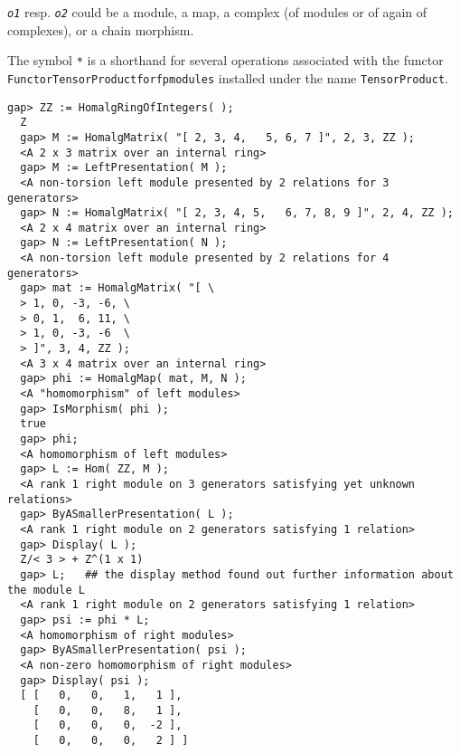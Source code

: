 \documentclass[a4paper,11pt]{report}
\begin{document}
{{{ \mbox{\texttt{\slshape o1}} resp. \mbox{\texttt{\slshape o2}} could be a module, a map, a complex (of modules or of again of complexes), or
a chain morphism. 

 The symbol \texttt{*} is a shorthand for several operations associated with the functor \texttt{Functor{\textunderscore}TensorProduct{\textunderscore}for{\textunderscore}fp{\textunderscore}modules} installed under the name \texttt{TensorProduct}. 
\begin{Verbatim}[fontsize=\small,frame=single,label=Example]
  gap> ZZ := HomalgRingOfIntegers( );
  Z
  gap> M := HomalgMatrix( "[ 2, 3, 4,   5, 6, 7 ]", 2, 3, ZZ );
  <A 2 x 3 matrix over an internal ring>
  gap> M := LeftPresentation( M );
  <A non-torsion left module presented by 2 relations for 3 generators>
  gap> N := HomalgMatrix( "[ 2, 3, 4, 5,   6, 7, 8, 9 ]", 2, 4, ZZ );
  <A 2 x 4 matrix over an internal ring>
  gap> N := LeftPresentation( N );
  <A non-torsion left module presented by 2 relations for 4 generators>
  gap> mat := HomalgMatrix( "[ \
  > 1, 0, -3, -6, \
  > 0, 1,  6, 11, \
  > 1, 0, -3, -6  \
  > ]", 3, 4, ZZ );
  <A 3 x 4 matrix over an internal ring>
  gap> phi := HomalgMap( mat, M, N );
  <A "homomorphism" of left modules>
  gap> IsMorphism( phi );
  true
  gap> phi;
  <A homomorphism of left modules>
  gap> L := Hom( ZZ, M );
  <A rank 1 right module on 3 generators satisfying yet unknown relations>
  gap> ByASmallerPresentation( L );
  <A rank 1 right module on 2 generators satisfying 1 relation>
  gap> Display( L );
  Z/< 3 > + Z^(1 x 1)
  gap> L;	## the display method found out further information about the module L
  <A rank 1 right module on 2 generators satisfying 1 relation>
  gap> psi := phi * L;
  <A homomorphism of right modules>
  gap> ByASmallerPresentation( psi );
  <A non-zero homomorphism of right modules>
  gap> Display( psi );
  [ [   0,   0,   1,   1 ],
    [   0,   0,   8,   1 ],
    [   0,   0,   0,  -2 ],
    [   0,   0,   0,   2 ] ]
  

\end{Verbatim}}}}
\end{document}
